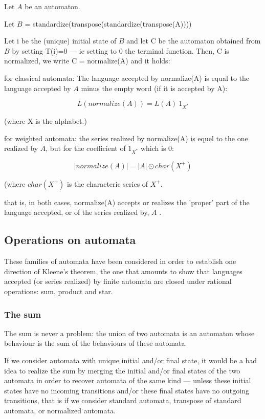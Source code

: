 Let $A$ be an automaton.

Let $B$ = standardize(transpose(standardize(transpose(A))))

Let i be the (unique) initial state of $B$ and let C be the automaton
obtained from $B$ by setting T(i)=0 --- ie setting to 0 the terminal
function. Then, C is normalized, we write C = normalize(A) and it
holds:

for classical automata: The language accepted by normalize(A) is equal
to the language accepted by $A$ minus the empty word (if it is accepted
by A):

\begin{displaymath}
  L(normalize(A))  =  L(A) \ 1_{X^*}
\end{displaymath}

\noindent
(where  X  is the alphabet.)

for weighted automata: the series realized by normalize(A) is equel to
the one realized by $A$, but for the coefficient of $1_{X^*}$ which is 0:

\begin{displaymath}
  |normalize(A)|  =  |A| \odot  char(X^+)
\end{displaymath}

\noindent
(where  $char(X^+)$  is the characteric series of  $X^+$.

that is, in both cases, normalize(A) accepts or realizes the 'proper'
part of the language accepted, or of the series realized by, $A$ .

\subsection{Operations on automata}

These families of automata have been considered in order to establish
one direction of Kleene's theorem, the one that amounts to show that
languages accepted (or series realized) by finite automata are closed
under rational operations: sum, product and star.

\subsubsection{The sum}

The sum is never a problem: the union of two automata is an automaton
whose behaviour is the sum of the behaviours of these automata.

\begin{remark}
  If we consider automata with unique initial and/or final state, it
  would be a bad idea to realize the sum by merging the initial and/or
  final states of the two automata in order to recover automata of the
  same kind --- unless these initial states have no incoming
  transitions and/or these final states have no outgoing transitions,
  that is if we consider standard automata, transpose of standard
  automata, or normalized automata.
\end{remark}

